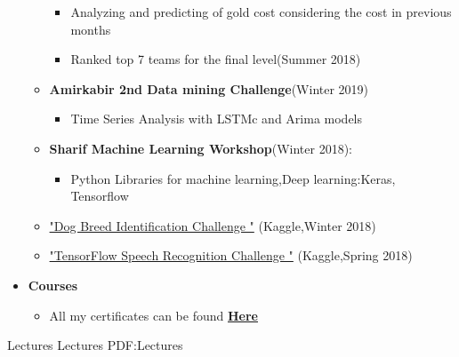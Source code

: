 \documentclass[letterpaper,MMMyyyy,nonstopmode]{simpleresumecv}
\begin{document}
\begin{Body}
\begin{itemize}
\begin{itemize}
\begin{itemize}
     \item Analyzing and predicting of gold cost considering the cost in previous months
     \item Ranked top 7 teams for the final level(Summer 2018)
    
   
    \end{itemize}



\item \textbf {Amirkabir 2nd Data mining Challenge}(Winter 2019)
    	
   \begin{itemize}
	   
     \item Time Series Analysis with LSTMc and Arima models
  
   \end{itemize}


\item     \textbf{ Sharif Machine Learning Workshop}(Winter 2018):
	      \begin{itemize}
	          \item Python Libraries for machine learning,Deep learning:Keras, Tensorflow
	      
	      
	      \end{itemize}

         	\item 
      \href{ https://www.kaggle.com/c/dog-breed-identification}{"Dog Breed Identification Challenge "} (Kaggle,Winter 2018)
      

 
        	\item 
      \href{https://www.kaggle.com/c/tensorflow-speech-recognition-challenge}{"TensorFlow Speech Recognition Challenge "} (Kaggle,Spring 2018)
 
   \end{itemize}     
       \end{itemize}  
        
 \begin{itemize}
    \item \textbf{Courses}
    \begin{itemize}
        \item 
    All my certificates can be found \href{https://github.com/Yasaman1997/Certificates} {\textbf{Here}}
    \end{itemize}
  \end{itemize}
  
 \Section
{Lectures}
{Lectures}
{PDF:Lectures}


\end{Body}
\end{document}
